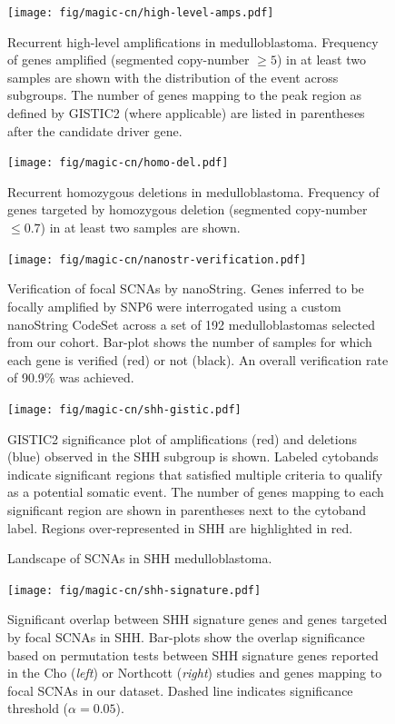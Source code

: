 \documentclass[11pt,letterpaper]{article}
\theoremstyle{definition}
\begin{document}
\begin{figure}
	\centering
	\texttt{[image: fig/magic-cn/high-level-amps.pdf]}
	\caption{Recurrent high-level amplifications in medulloblastoma.
	Frequency of genes amplified (segmented copy-number $\geq 5$) in at least two samples are shown with the distribution of the event across subgroups. The number of genes mapping to the peak region as defined by GISTIC2 (where applicable) are listed in parentheses after the candidate driver gene.}
	\label{fig:high-level-amps}
\end{figure}

\begin{figure}
	\centering
	\texttt{[image: fig/magic-cn/homo-del.pdf]}
	\caption{Recurrent homozygous deletions in medulloblastoma. Frequency of genes targeted by homozygous deletion (segmented copy-number $\leq 0.7$) in at least two samples are shown.}
	\label{fig:homo-del}
\end{figure}

\begin{figure}
	\centering
	\texttt{[image: fig/magic-cn/nanostr-verification.pdf]}
	\caption{Verification of focal SCNAs by nanoString.
	Genes inferred to be focally amplified by SNP6 were interrogated using a custom nanoString CodeSet across a set of 192 medulloblastomas selected from our cohort. Bar-plot shows the number of samples for which each gene is verified (red) or not (black). An overall verification rate of 90.9\% was achieved.}
	\label{fig:nanostr-verification}
\end{figure}

\clearpage

\begin{figure}[h]
	\begin{center}
		\texttt{[image: fig/magic-cn/shh-gistic.pdf]}
	\end{center}
	\caption{Landscape of SCNAs in SHH medulloblastoma.}
	GISTIC2 significance plot of amplifications (red) and deletions (blue) observed in the SHH subgroup is shown.
	Labeled cytobands indicate significant regions that satisfied multiple criteria to qualify as a potential somatic event. The number of genes mapping to each significant region are shown in parentheses next to the cytoband label.  Regions over-represented in SHH are highlighted in red.
	\label{fig:shh-gistic}
\end{figure}

\clearpage

\begin{figure}
	\centering
	\texttt{[image: fig/magic-cn/shh-signature.pdf]}
	\caption{Significant overlap between SHH signature genes and genes targeted by focal SCNAs in SHH.
		Bar-plots show the overlap significance based on permutation tests between SHH signature genes reported in the Cho (\emph{left}) or Northcott (\emph{right}) studies and genes mapping to focal SCNAs in our dataset. Dashed line indicates significance threshold ($\alpha = 0.05$).}
	\label{fig:shh-signature}
\end{figure}
\end{document}
